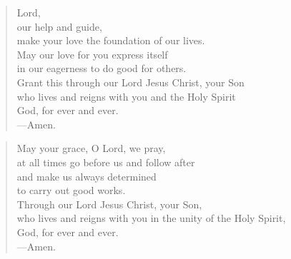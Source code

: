 \prayer

\setlength{\leftmargini}{\prayerleftmargini}

\begin{verse}
Lord,\\
our help and guide,\\
make your love the foundation of our lives.\\
May our love for you express itself\\
in our eagerness to do good for others.\\
Grant this through our Lord Jesus Christ, your Son\\
who lives and reigns with you and the Holy Spirit\\
God, for ever and ever.\\
{\color{red}---\thinspace}Amen.
\end{verse}


\begin{verse}
May your grace, O Lord, we pray,\\
at all times go before us and follow after\\
and make us always determined\\
to carry out good works.\\
Through our Lord Jesus Christ, your Son,\\
who lives and reigns with you in the unity of the Holy Spirit,\\
God, for ever and ever.\\
{\color{red}---\thinspace}Amen.
\end{verse}

\setlength{\leftmargini}{\defleftmargini}